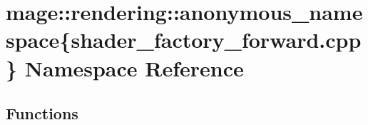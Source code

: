 \hypertarget{namespacemage_1_1rendering_1_1anonymous__namespace_02shader__factory__forward_8cpp_03}{}\section{mage\+:\+:rendering\+:\+:anonymous\+\_\+namespace\{shader\+\_\+factory\+\_\+forward.\+cpp\} Namespace Reference}
\label{namespacemage_1_1rendering_1_1anonymous__namespace_02shader__factory__forward_8cpp_03}
\subsection*{Functions}
